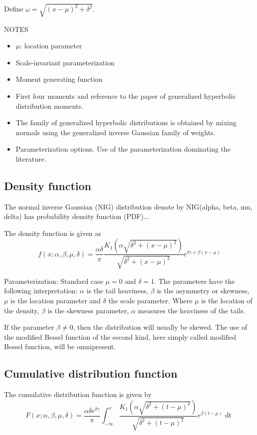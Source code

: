 \documentclass[10pt,a4paper,oneside]{article}
\numberwithin{equation}{section}
\begin{document}
Define $\omega = \sqrt{(x-\mu)^2 + \delta^2}$.

NOTES
\begin{itemize}
\item $\mu$: location parameter
\item Scale-invariant parameterization
\item Moment generating function
\item First four moments and reference to the paper of generalized hyperbolic distribution moments.
\item The family of generalized hyperbolic distributions is obtained by mixing normals using the generalized inverse Gaussian family of weights.
\item Parameterization options. Use of the parameterization dominating the literature.
\end{itemize}

\subsection{Density function}
The normal inverse Gaussian (NIG) distribution denote by NIG(alpha, beta, mu, delta) has probability density function (PDF)...

The density function is given as
\begin{equation}
f(x; \alpha, \beta, \mu, \delta) = \frac{\alpha \delta}{\pi} \frac{K_1\left(\alpha\sqrt{\delta^2 + (x-\mu)^2}\right)}{\sqrt{\delta^2 + (x-\mu)^2}} e^{\delta \gamma + \beta(x-\mu)}
\end{equation}

Parameterization: Standard case $\mu = 0$ and $\delta = 1$. The parameters have the following interpretation: $\alpha$ is the tail heaviness, $\beta$ is the asymmetry or skewness, $\mu$ is the location parameter and $\delta$ the scale parameter. Where $\mu$ is the location of the density, $\beta$ is the skewness parameter, $\alpha$ measures the heaviness of the tails.

If the parameter $\beta \neq 0$, then the distribution will usually be skewed. 
The use of the modified Bessel function of the second kind, here simply called modified Bessel function, will be omnipresent.

\subsection{Cumulative distribution function}\label{properties_cdf}
The cumulative distribution function is given by
\begin{equation}\label{integral_k1}
F(x; \alpha, \beta, \mu, \delta) = \frac{\alpha \delta e^{\delta \gamma}}{\pi} \int_{-\infty}^{x} \frac{K_1\left(\alpha\sqrt{\delta^2 + (t-\mu)^2}\right)}{\sqrt{\delta^2 + (t-\mu)^2}} e^{\beta(t-\mu)} \mathop{dt}
\end{equation}
\end{document}
